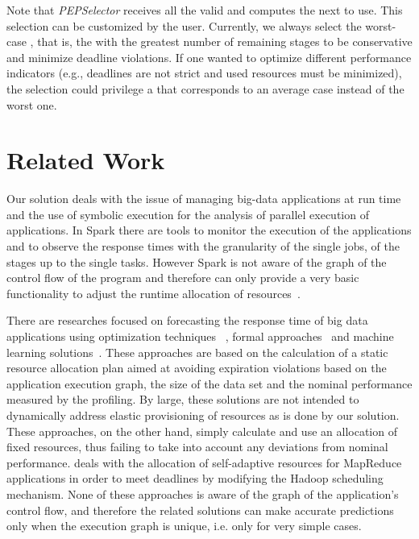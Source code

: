 Note that \textit{PEPSelector} receives all the valid \plans and computes the next \plan to use. This selection can be customized by the user. Currently, we always select the worst-case \plan, that is, the \plan with the greatest number of remaining stages to be conservative and minimize deadline violations. If one wanted to optimize different performance indicators (e.g., deadlines are not strict and used resources must be minimized), the selection could privilege a \plan that corresponds to an average case instead of the worst one.

\section{Related Work}\label{sec:related_work}
Our solution deals with the issue of managing big-data applications at run time and the use of symbolic execution for the analysis of parallel execution of applications.
In Spark there are tools to monitor the execution of the applications and to observe the response times with the granularity of the single jobs, of the stages up to the single tasks. However Spark is not aware of the graph of the control flow of the program and therefore can only provide a very basic functionality to adjust the runtime allocation of resources~\cite{SparkDynamic}.

There are researches focused on forecasting the response time of big data applications using optimization techniques ~\cite{gibilisco2016stage, Sidhanta2016, dSpark}, formal approaches~\cite{nfm} and machine learning solutions~\cite{Alipourfard}. These approaches are based on the calculation of a static resource allocation plan aimed at avoiding expiration violations based on the application execution graph, the size of the data set and the nominal performance measured by the profiling. By large, these solutions are not intended to dynamically address elastic provisioning of resources as is done by our solution. These approaches, on the other hand, simply calculate and use an allocation of fixed resources, thus failing to take into account any deviations from nominal performance. 
\cite{Kc2010, Polo2010} deals with the allocation of self-adaptive resources for MapReduce applications in order to meet deadlines by modifying the Hadoop scheduling mechanism.
None of these approaches is aware of the graph of the application's control flow, and therefore the related solutions can make accurate predictions only when the execution graph is unique, i.e. only for very simple cases.

